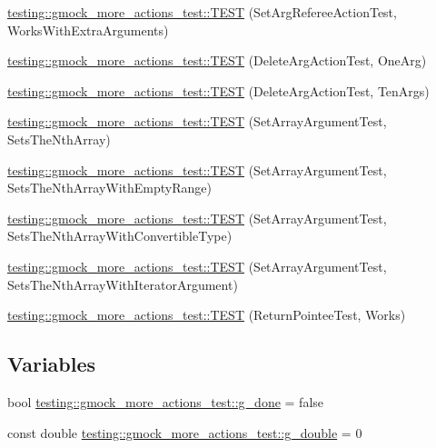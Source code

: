 \begin{DoxyCompactItemize}
\item 
\hyperlink{namespacetesting_1_1gmock__more__actions__test_a0ea4f3d8f1a643726e37825c58d8741f}{testing\+::gmock\+\_\+more\+\_\+actions\+\_\+test\+::\+T\+E\+ST} (Set\+Arg\+Referee\+Action\+Test, Works\+With\+Extra\+Arguments)
\item 
\hyperlink{namespacetesting_1_1gmock__more__actions__test_a575e9a6f5bfcc133188e973147697425}{testing\+::gmock\+\_\+more\+\_\+actions\+\_\+test\+::\+T\+E\+ST} (Delete\+Arg\+Action\+Test, One\+Arg)
\item 
\hyperlink{namespacetesting_1_1gmock__more__actions__test_a972b47a7e96b95606190afa928ea2db4}{testing\+::gmock\+\_\+more\+\_\+actions\+\_\+test\+::\+T\+E\+ST} (Delete\+Arg\+Action\+Test, Ten\+Args)
\item 
\hyperlink{namespacetesting_1_1gmock__more__actions__test_aacf568e3d16b210aa2316ccc2cb6b22d}{testing\+::gmock\+\_\+more\+\_\+actions\+\_\+test\+::\+T\+E\+ST} (Set\+Array\+Argument\+Test, Sets\+The\+Nth\+Array)
\item 
\hyperlink{namespacetesting_1_1gmock__more__actions__test_a63a338ef41086b80dba5729ecd1073e5}{testing\+::gmock\+\_\+more\+\_\+actions\+\_\+test\+::\+T\+E\+ST} (Set\+Array\+Argument\+Test, Sets\+The\+Nth\+Array\+With\+Empty\+Range)
\item 
\hyperlink{namespacetesting_1_1gmock__more__actions__test_a42955fc99954c095f9d7ded3b92c091f}{testing\+::gmock\+\_\+more\+\_\+actions\+\_\+test\+::\+T\+E\+ST} (Set\+Array\+Argument\+Test, Sets\+The\+Nth\+Array\+With\+Convertible\+Type)
\item 
\hyperlink{namespacetesting_1_1gmock__more__actions__test_a5db6a5413414f6d9bb8a24d1f07bf882}{testing\+::gmock\+\_\+more\+\_\+actions\+\_\+test\+::\+T\+E\+ST} (Set\+Array\+Argument\+Test, Sets\+The\+Nth\+Array\+With\+Iterator\+Argument)
\item 
\hyperlink{namespacetesting_1_1gmock__more__actions__test_a690ef20bd9c281781eddcf99b18cff6c}{testing\+::gmock\+\_\+more\+\_\+actions\+\_\+test\+::\+T\+E\+ST} (Return\+Pointee\+Test, Works)
\end{DoxyCompactItemize}
\subsection*{Variables}
\begin{DoxyCompactItemize}
\item 
bool \hyperlink{namespacetesting_1_1gmock__more__actions__test_ab2d168581c62c89bd00cdadcccd9e8e4}{testing\+::gmock\+\_\+more\+\_\+actions\+\_\+test\+::g\+\_\+done} = false
\item 
const double \hyperlink{namespacetesting_1_1gmock__more__actions__test_a73552112032ff5d5900dd6f128a62718}{testing\+::gmock\+\_\+more\+\_\+actions\+\_\+test\+::g\+\_\+double} = 0
\end{DoxyCompactItemize}

